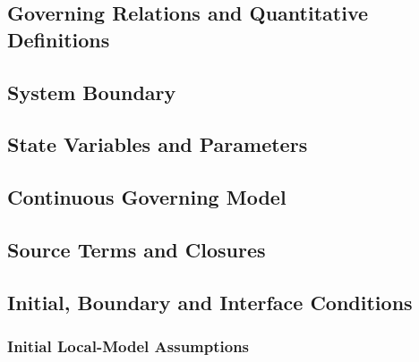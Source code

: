 \subsection{Governing Relations and Quantitative Definitions}
\label{sec:res-mod-asm-governing-relations}

%

\subsection{System Boundary}
\label{sec:res-mod-asm-system-boundary}


\subsection{State Variables and Parameters}
\label{sec:res-mod-asm-state-variables-parameters}


\subsection{Continuous Governing Model}
\label{sec:res-mod-asm-continuous-governing-model}


\subsection{Source Terms and Closures}
\label{sec:res-mod-asm-source-terms-closures}


\subsection{Initial, Boundary and Interface Conditions}
\label{sec:res-mod-asm-initial-boundary-interface-conditions}


\subsubsection{Initial Local-Model Assumptions}
\label{sec:res-mod-asm-local-initial-assumptions}

